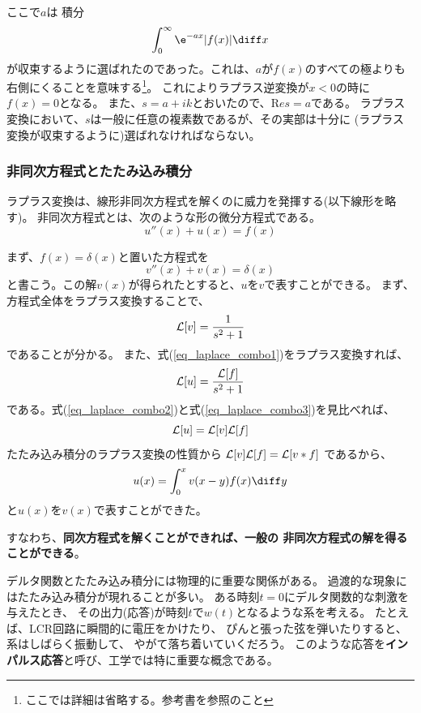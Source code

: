 ここで$a$は 積分
\begin{equation}
  \int_0^{\infty} \e^{-ax} |f(x)| \diff x
\end{equation}
が収束するように選ばれたのであった。これは、$a$が$f(x)$のすべての極よりも
右側にくることを意味する\footnote{ここでは詳細は省略する。参考書を参照のこと}。
これによりラプラス逆変換が$x<0$の時に$f(x)=0$となる。
また、$s = a + ik$とおいたので、${\mathrm Re} s = a$である。
ラプラス変換において、$s$は一般に任意の複素数であるが、その実部は十分に
(ラプラス変換が収束するように)選ばれなければならない。

\subsubsection{非同次方程式とたたみ込み積分}

ラプラス変換は、線形非同次方程式を解くのに威力を発揮する(以下線形を略す)。
非同次方程式とは、次のような形の微分方程式である。
\begin{equation}
  u''(x) + u(x) = f(x) \label{eq_laplace_combo1}
\end{equation}

まず、$f(x)=\delta(x)$と置いた方程式を
\begin{equation}
  v''(x) + v(x) = \delta(x)
\end{equation}
と書こう。この解$v(x)$が得られたとすると、$u$を$v$で表すことができる。
まず、方程式全体をラプラス変換することで、
\begin{equation}
  {\cal L}[v] = \frac{1}{s^2+1} \label{eq_laplace_combo2}
\end{equation}
であることが分かる。
また、式(\ref{eq_laplace_combo1})をラプラス変換すれば、
\begin{equation}
  {\cal L}[u] = \frac{{\cal L}[f]}{s^2+1}\label{eq_laplace_combo3}
\end{equation}
である。式(\ref{eq_laplace_combo2})と式(\ref{eq_laplace_combo3})を見比べれば、
\begin{equation}
  {\cal L}[u] = {\cal L}[v] {\cal L}[f]
\end{equation}
たたみ込み積分のラプラス変換の性質から
${\cal L}[v] {\cal L}[f] = {\cal L}[v*f]$
であるから、
\begin{equation}
  u(x) = \int_0^{x} v(x-y)f(x)  \diff y
\end{equation}
と$u(x)$を$v(x)$で表すことができた。

すなわち、{\bf 同次方程式を解くことができれば、一般の
非同次方程式の解を得ることができる}。

デルタ関数とたたみ込み積分には物理的に重要な関係がある。
過渡的な現象にはたたみ込み積分が現れることが多い。
ある時刻$t=0$にデルタ関数的な刺激を与えたとき、
その出力(応答)が時刻$t$で$w(t)$となるような系を考える。
たとえば、LCR回路に瞬間的に電圧をかけたり、
ぴんと張った弦を弾いたりすると、系はしばらく振動して、
やがて落ち着いていくだろう。
このような応答を{\bf インパルス応答}と呼び、工学では特に重要な概念である。


